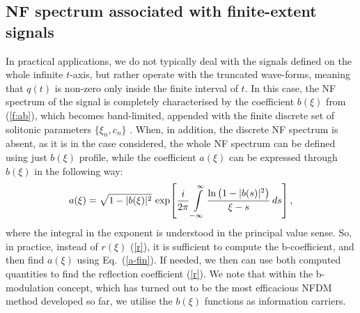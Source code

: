 \subsection*{NF spectrum associated with finite-extent signals}
In practical applications, we do not typically deal with the signals defined on the whole infinite $t$-axis, but rather operate with the truncated wave-forms, meaning that $q(t)$ is non-zero only inside the finite interval of $t$. In this case, the NF spectrum of the signal is completely characterised by the coefficient $b(\xi)$ from (\ref{f:ab}), which becomes band-limited, appended with the finite discrete set of solitonic parameters $\{\xi_n,c_n\}$ \cite{gzl18,svp20}. When, in addition, the discrete NF spectrum is absent, as it is in the case considered, the whole NF spectrum can be defined using just $b(\xi)$ profile\cite{w17}, while the coefficient $a(\xi)$ can be expressed through $b(\xi)$ in the following way:
\begin{equation}\label{a-fin}
a(\xi) = \sqrt{1-|b(\xi)|^2} \, \exp \! \left[ \frac{i}{2 \pi} \intop^{\infty}_{-\infty} \frac{\ln \big(1-|b(s)|^2 \big)}{\xi - s} \, ds \right],
\end{equation}
where the integral in the exponent is understood in the principal value sense.
So, in practice, instead of $r(\xi)$ (\ref{r}), it is sufficient to compute the b-coefficient, and then find $a(\xi)$ using Eq.~(\ref{a-fin}). If needed, we then can use both computed quantities to find the reflection coefficient (\ref{r}). We note that within the b-modulation concept, which has turned out to be the most efficacious NFDM method developed so far, we utilise the $b(\xi)$ functions as information carriers\cite{w17,gzl18,svp20,cw20}.



